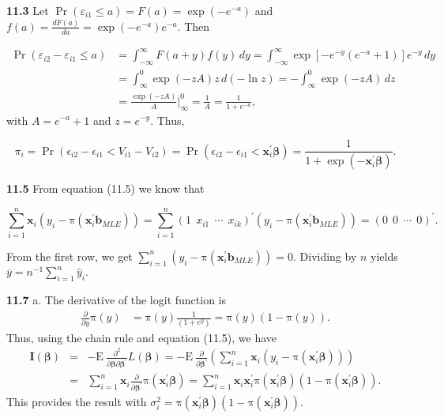 \textbf{11.3} Let $\Pr(\varepsilon_{i1} \leq a) =
F(a)=\exp(-e^{-a})$ and $f(a)=\frac{dF(a)}{da}=\exp(-e^{-a})e^{-a}.$
Then

\begin{align*}
\Pr(\varepsilon_{i2}-\varepsilon_{i1} \leq a)
&=\int_{-\infty}^{\infty}F(a+y)f(y)\,dy=\int_{-\infty}^{\infty}\exp\left[-e^{-y}(e^{-a}+1)\right]e^{-y}\,dy\\
&=\int_{\infty}^0\exp(-zA)z \,d(-\ln z)=-\int_{\infty}^0\exp(-zA)\,dz\\
&= \frac{\exp(-zA)}{A}|_\infty^0=\frac{1}{A}=\frac{1}{1+e^{-a}},
\end{align*}
with $A=e^{-a}+1$ and $z=e^{-y}$. Thus,

\begin{equation*}
\pi_i=\Pr (\epsilon _{i2}-\epsilon _{i1}<V_{i1}-V_{i2})=\Pr
(\epsilon _{i2}-\epsilon _{i1}<\mathbf{x}_i^{\mathbf{\prime
}}\boldsymbol \beta) =\frac{1}{1+\exp (-\mathbf{x}_i^{\mathbf{\prime
}}\boldsymbol \beta)}.
\end{equation*}

\textbf{11.5} From equation (11.5) we know that

\begin{equation*}
\sum\limits_{i=1}^{n}\mathbf{x}_i\left( y_i-\mathrm{\pi }(\mathbf{x}
_i^{\mathbf{\prime}}\mathbf{b}_{MLE})\right) =
\sum\limits_{i=1}^{n}(1~~x_{i1}~~\cdots~~x_{ik})^\prime \left(
y_i-\mathrm{\pi }(\mathbf{x}
_i^{\mathbf{\prime}}\mathbf{b}_{MLE})\right)
=(0~~0~~\cdots~~0)^{\prime}.
\end{equation*}

From the first row, we get $\sum\limits_{i=1}^{n} \left(
y_i-\mathrm{\pi }(\mathbf{x}
_i^{\mathbf{\prime}}\mathbf{b}_{MLE})\right) =0$. Dividing by $n$
yields $\overline{y} = n^{-1} \sum_{i=1}^n \widehat{y}_i .$



\textbf{11.7} a. The derivative of the logit function is
\begin{eqnarray*}
\frac{\partial}{\partial y}\mathrm{\pi}(y) &=
\mathrm{\pi}(y)\frac{1}{(1+e^y)}=\mathrm{\pi}(y)(1-\mathrm{\pi}(y)).
\end{eqnarray*}
Thus, using the chain rule and equation (11.5), we have
\begin{eqnarray*}
\mathbf{I}(\boldsymbol \beta) &=&  - \mathrm{E~}\frac{\partial
^{2}}{\partial \boldsymbol \beta\partial \boldsymbol \beta ^{\prime
}}L(\boldsymbol \beta) = -\mathrm{E~} \frac{\partial }{\partial
\boldsymbol \beta^{\prime}} \left(
\sum\limits_{i=1}^{n}\mathbf{x}_i\left( y_i-\mathrm{\pi }(\mathbf{x}
_i^{\mathbf{\prime }}\boldsymbol \beta)\right) \right) \\
&=& \sum\limits_{i=1}^{n}\mathbf{x}_i \frac{\partial }{\partial
\boldsymbol \beta^{\prime}} \mathrm{\pi }(\mathbf{x}
_i^{\mathbf{\prime }}\boldsymbol \beta)
=\sum\limits_{i=1}^{n}\mathbf{x}_i \mathbf{x}_i^{\prime}
\mathrm{\pi}(\mathbf{x} _i^{\mathbf{\prime}}\boldsymbol
\beta)(1-\mathrm{\pi}(\mathbf{x} _i^{\mathbf{\prime}}\boldsymbol
\beta)).
\end{eqnarray*}
This provides the result with $\sigma_i^2 =
\mathrm{\pi}(\mathbf{x}_i^{\prime} \boldsymbol
\beta)(1-\mathrm{\pi}(\mathbf{x}_i^{\prime}\boldsymbol \beta))$.\\


